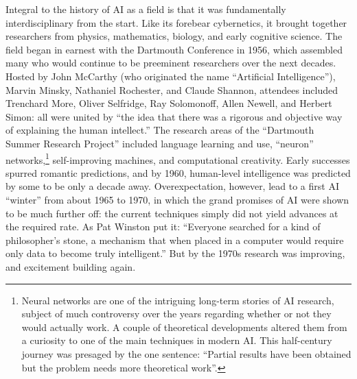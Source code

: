 Integral to the history of AI as a field is that it was fundamentally
interdisciplinary from the start. Like its forebear cybernetics, it
brought together researchers from physics, mathematics, biology, and
early cognitive science. The field began in earnest with the Dartmouth
Conference in 1956, which assembled many who would continue to
be preeminent researchers over the next decades. Hosted by John
McCarthy (who originated the name
``Artificial Intelligence''), Marvin Minsky, Nathaniel Rochester, and
Claude Shannon, attendees included Trenchard More, Oliver Selfridge,
Ray Solomonoff, Allen Newell, and Herbert Simon: all were united by
``the idea that there was a rigorous and objective way of explaining
the human intellect.''\cite[Ch. 5]{mccorduck} The research areas of
the ``Dartmouth Summer Research Project'' included language learning
and use, ``neuron'' networks,\footnote{Neural networks are one of the
  intriguing long-term stories of AI research, subject of much
  controversy over the years regarding whether or not they would
  actually work. A couple of theoretical developments altered them
  from a curiosity to one of the main techniques in modern AI. This
  half-century journey was presaged by the one sentence: ``Partial
  results have been obtained but the problem needs more theoretical
  work''.\cite{dartmouthconf}} self-improving machines, and computational 
creativity.\cite{dartmouthconf} Early successes spurred romantic
predictions, and by 1960, human-level intelligence was predicted by
some to be only a decade away.\cite[p. 3]{winston} Overexpectation, however,
lead to a first AI ``winter'' from about 1965 to 1970, in which the
grand promises of AI were shown to be much further off: the current
techniques simply did not yield advances at the required rate. As Pat
Winston put it: ``Everyone searched for a kind of philosopher's stone,
a mechanism that when placed in a computer would require only data to
become truly intelligent.''\cite[p. 4]{winston} But by the 1970s
research was improving, and excitement building again.


